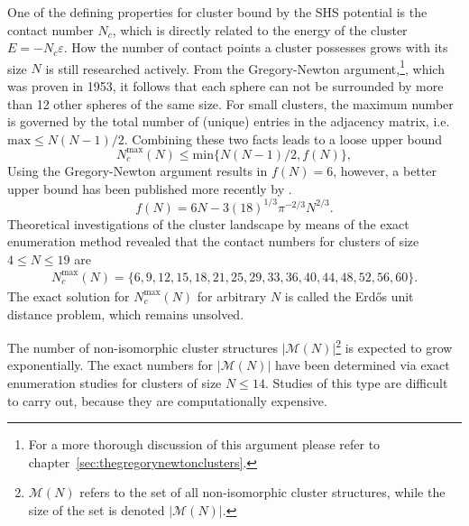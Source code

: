 One of the defining properties for cluster bound by the \ac{SHS} potential is
the contact number $N_c$, which is directly related to the energy of the cluster
$E=-N_c\varepsilon$. How the number of contact points a cluster possesses grows
with its size $N$ is still researched actively. From the Gregory-Newton
argument,\footnote{For a more thorough discussion of this argument please refer
to chapter~\ref{sec:thegregorynewtonclusters}.}, which was proven in 1953, it
follows that each sphere can not be surrounded by more than 12 other spheres of
the same size. For small clusters, the maximum number is governed by the total
number of (unique) entries in the adjacency matrix, i.e. $\text{max}\leq
N(N-1)/2$. Combining these two facts leads to a loose upper bound
%
\begin{equation}
    N_c^\mathrm{max}(N) \le \text{min}\{N(N-1)/2,f(N)\},
    \label{eqn:upperlimitNc}
\end{equation}
%
Using the Gregory-Newton argument results in $f(N)=6$, however, a better upper
bound has been published more recently by
\citeauthor{Bezdek-2013}\autocite{Bezdek-2013}.
%
\begin{equation}
    f(N)=6N-3(18)^{1/3}\pi^{-2/3}N^{2/3}.
    \label{eqn:upperlimitBR}
\end{equation}
%
Theoretical investigations of the cluster landscape by means of the exact
enumeration method revealed that the contact numbers for clusters of size $4
\leq N \leq 19$ are\autocite{Hoy_Structuredynamicsmodel_2015,Holmes-Cerfon_EnumeratingRigidSphere_2016}
%
\begin{align}
    N_c^\mathrm{max}(N) =\{6,9,12,15,18,21,25,29,33,36,40,44,48,52,56,60\}.
\end{align}
%
The exact solution for $N_c^\mathrm{max}(N)$ for arbitrary $N$ is called the
Erd\H{o}s unit distance problem, which remains unsolved.\autocite{Erdos-1946}

The number of non-isomorphic cluster structures
$|\mathcal{M}(N)|$\footnote{$\mathcal{M}(N)$ refers to the set of all
non-isomorphic cluster structures, while the size of the set is denoted
$|\mathcal{M}(N)|$.} is expected to grow
exponentially.\autocite{Stillinger_Exponentialmultiplicityinherent_1999,Oganov-2006,Forman_ModelingAggregationProcesses_2017}
The exact numbers for $|\mathcal{M}(N)|$ have been determined via exact
enumeration studies for clusters of size $N \leq
14$.\autocite{Hoy_Structuredynamicsmodel_2015,Holmes-Cerfon_EnumeratingRigidSphere_2016}
Studies of this type are difficult to carry out, because they are
computationally expensive.\autocite{Heiles_Globaloptimizationclusters_2013}

